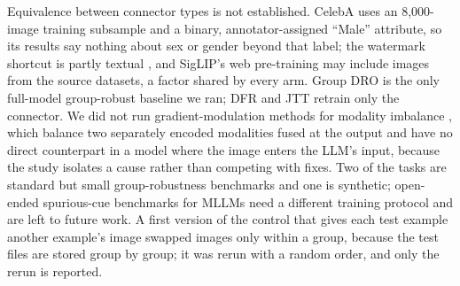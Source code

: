 Equivalence between connector types is not established. CelebA uses an 8,000-image training subsample and a binary,
annotator-assigned ``Male'' attribute, so its results say nothing about sex or gender beyond that label; the watermark
shortcut is partly textual \citep{materzynska2022disentangling}, and SigLIP's web pre-training may include images from the
source datasets, a factor shared by every arm. Group DRO is the only full-model group-robust baseline we ran; DFR
and JTT retrain only the connector. We did not run gradient-modulation methods for modality imbalance
\citep{peng2022balanced}, which balance two separately encoded modalities fused at the output and have no direct
counterpart in a model where the image enters the LLM's input, because the study isolates a cause rather than
competing with fixes. Two of the tasks are standard but small
group-robustness benchmarks and one is synthetic; open-ended spurious-cue benchmarks for MLLMs
\citep{ye2026mmspubench,yang2025spuriverse} need a different training protocol and are left to future work. A first version
of the control that gives each test example another example's image swapped images only within a group, because the
test files are stored group by group; it was rerun with a random order, and only the rerun is reported.
